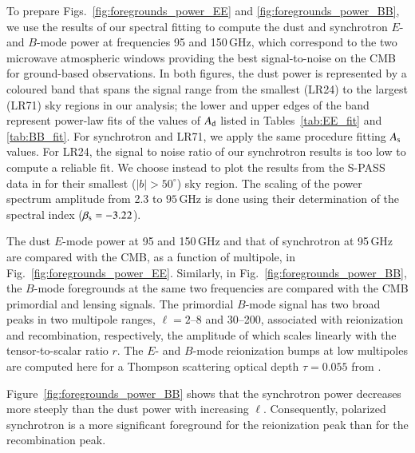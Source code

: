 \documentclass[longauth,traditabstract]{aa}
\begin{document}
To prepare Figs.~\ref{fig:foregrounds_power_EE} and \ref{fig:foregrounds_power_BB}, we use the results of our spectral fitting to compute the dust and synchrotron $E$- and $B$-mode power at frequencies 95 and 150\,GHz, which
correspond to the two microwave atmospheric windows providing the best signal-to-noise on the CMB for ground-based observations. 
In both figures, the dust  power is represented by a coloured band that spans the signal range from the smallest (LR24) to the largest (LR71) sky regions in our analysis;
the lower and upper edges of the band represent power-law fits of the values of $A_{\rm d}$  listed in Tables~\ref{tab:EE_fit} and \ref{tab:BB_fit}.
For synchrotron and LR71, we apply the same procedure fitting $A_{\rm s}$ values. For LR24, the signal to noise ratio of our synchrotron results is too low to compute a reliable fit. We choose instead to plot 
the results from the S-PASS data in \citet{Krachmalnicoff18} for their smallest ($|b|>50^\circ$) sky region.  The scaling of the power spectrum amplitude from 2.3 to $95\,$GHz is done using their determination 
of the spectral index ($\beta_{\rm s} = -3.22$). 
%

The dust $E$-mode power at 95 and 150\,GHz and that of synchrotron at 95\,GHz are compared with the CMB, as a function of multipole, in Fig.~\ref{fig:foregrounds_power_EE}.
Similarly, in Fig.~\ref{fig:foregrounds_power_BB}, the $B$-mode foregrounds at the same two frequencies are compared with the CMB primordial and lensing signals.
%
The primordial $B$-mode signal has two broad peaks in two multipole ranges, $\ell =2$--8 and 30--200, associated with reionization and recombination, respectively, the amplitude of which
scales linearly with the tensor-to-scalar ratio $r$.
The $E$- and $B$-mode reionization bumps at low multipoles are computed here for a Thompson scattering optical depth $\tau =0.055$ from \citet{planck2014-a10}.


Figure~\ref{fig:foregrounds_power_BB} shows that the synchrotron power decreases more steeply than the dust power with increasing $\ell$. 
Consequently, polarized synchrotron is a more significant foreground for the reionization peak than for the recombination peak. 
 
\end{document}
